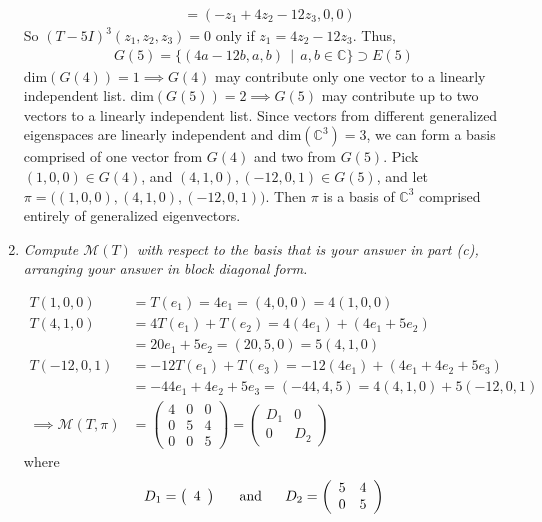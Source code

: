 \documentclass[12pt]{article}
\newcommand{\suchthat}{\, \mid \,}
\begin{document}
\begin{enumerate}[\ \ \it(a)\ \ ]
\begin{align*}
		&= (-z_1 + 4z_2 -12z_3, 0, 0)
	\end{align*}
	So $(T - 5I)^3(z_1, z_2, z_3) = 0$ only if $z_1 = 4z_2 - 12z_3$.  Thus,
	\begin{align*}
		G(5) = \{(4a - 12b, a, b) \suchthat a,b \in \mathbb{C}\} \supset E(5)
	\end{align*}
	$\text{dim}(G(4)) = 1 \implies G(4)$ may contribute only one vector to a linearly independent list.  $\text{dim}(G(5)) = 2 \implies G(5)$ may contribute up to two vectors to a linearly independent list.  Since vectors from different generalized eigenspaces are linearly independent and $\text{dim}(\mathbb{C}^3) = 3$, we can form a basis comprised of one vector from $G(4)$ and two from $G(5)$.  Pick $(1, 0, 0) \in G(4)$, and $(4, 1, 0), (-12, 0, 1) \in G(5)$, and let $\pi = \Big((1, 0, 0), (4, 1, 0), (-12, 0, 1)\Big)$.  Then $\pi$ is a basis of $\mathbb{C}^3$ comprised entirely of generalized eigenvectors.
	\item {\it Compute $\mathcal{M}(T)$ with respect to the basis that is your answer in part (c), arranging your answer in block diagonal form.}

	\begin{align*}
		T(1, 0, 0) &= T(e_1) = 4e_1 = (4, 0, 0) = 4(1, 0, 0) \\
		T(4, 1, 0) &= 4T(e_1) + T(e_2) = 4(4e_1) + (4e_1 + 5e_2) \\
		&= 20e_1 + 5e_2 = (20, 5, 0) = 5(4, 1, 0) \\
		T(-12, 0, 1) &= -12T(e_1) + T(e_3) = -12(4e_1) + (4e_1 + 4e_2 + 5e_3) \\
		&= -44e_1 + 4e_2 + 5e_3 = (-44, 4, 5) = 4(4, 1, 0) + 5(-12, 0, 1) \\
		\implies \mathcal{M}(T, \pi) &= \left(\begin{array}{ccc}
			4 & 0 & 0 \\
			0 & 5 & 4 \\
			0 & 0 & 5
		\end{array}\right) = \left(\begin{array}{cc}
			D_1 & 0 \\
			0 & D_2
		\end{array}\right)
	\end{align*}
	where
	\begin{align*}
		D_1 = \left(\begin{array}{c}
			4
		\end{array}\right) \ \ \ \ \ \text{and} \ \ \ \ \ \hfill D_2 = \left(\begin{array}{cc}
			5 & 4 \\
			0 & 5
		\end{array}\right)
	\end{align*}
\end{enumerate}
\end{document}
